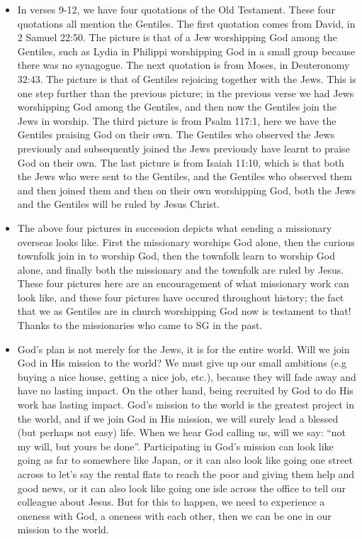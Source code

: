 \begin{itemize}
  \item{In verses 9-12, we have four quotations of the Old Testament.  These
  four quotations all mention the Gentiles.  The first quotation comes from
  David, in 2 Samuel 22:50.  The picture is that of a Jew worshipping God
  among the Gentiles, such as Lydia in Philippi worshipping God in a small
  group because there was no synagogue.  The next quotation is from Moses, in
  Deuteronomy 32:43.  The picture is that of Gentiles rejoicing together with
  the Jews.  This is one step further than the previous picture; in the
  previous verse we had Jews worshipping God among the Gentiles, and then now
  the Gentiles join the Jews in worship.  The third picture is from Psalm
  117:1, here we have the Gentiles praising God on their own.  The Gentiles
  who observed the Jews previously and subsequently joined the Jews
  previously have learnt to praise God on their own.  The last picture is
  from Isaiah 11:10, which is that both the Jews who were sent to the
  Gentiles, and the Gentiles who observed them and then joined them and then
  on their own worshipping God, both the Jews and the Gentiles will be ruled
  by Jesus Christ.}
  \item{The above four pictures in succession depicts what sending a
  missionary overseas looks like.  First the missionary worships God alone,
  then the curious townfolk join in to worship God, then the townfolk learn
  to worship God alone, and finally both the missionary and the townfolk are
  ruled by Jesus.  These four pictures here are an encouragement of what
  missionary work can look like, and these four pictures have occured
  throughout history; the fact that we as Gentiles are in church worshipping
  God now is testament to that!  Thanks to the missionaries who came to SG in
  the past.}
  \item{God's plan is not merely for the Jews, it is for the entire world.
  Will we join God in His mission to the world?  We must give up our small
  ambitions (e.g buying a nice house, getting a nice job, etc.), because they
  will fade away and have no lasting impact.  On the other hand, being
  recruited by God to do His work has lasting impact.  God's mission to the
  world is the greatest project in the world, and if we join God in His
  mission, we will surely lead a blessed (but perhaps not easy) life.  When
  we hear God calling us, will we say: ``not my will, but yours be done''. Participating in God's mission can look like going as far to somewhere like Japan, or it can also look like going one street across to let's say the rental flats to reach the poor and giving them help and good news, or it can also look like going one isle across the office to tell our colleague about Jesus. But for this to happen, we need to experience a oneness with God, a oneness with each other, then we can be one in our mission to the world.}
  \end{itemize}